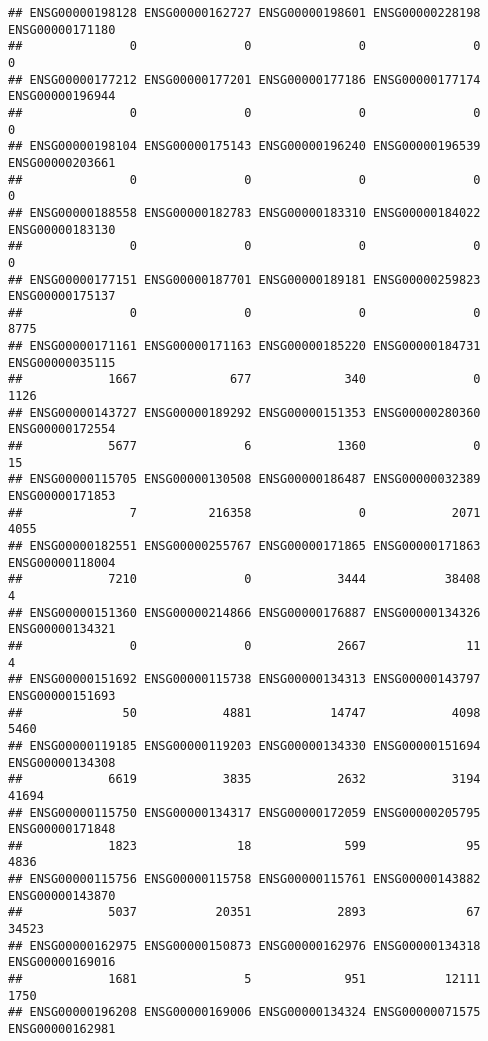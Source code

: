 \documentclass[
]{article}
\begin{document}
\begin{verbatim}
## ENSG00000198128 ENSG00000162727 ENSG00000198601 ENSG00000228198 ENSG00000171180 
##               0               0               0               0               0 
## ENSG00000177212 ENSG00000177201 ENSG00000177186 ENSG00000177174 ENSG00000196944 
##               0               0               0               0               0 
## ENSG00000198104 ENSG00000175143 ENSG00000196240 ENSG00000196539 ENSG00000203661 
##               0               0               0               0               0 
## ENSG00000188558 ENSG00000182783 ENSG00000183310 ENSG00000184022 ENSG00000183130 
##               0               0               0               0               0 
## ENSG00000177151 ENSG00000187701 ENSG00000189181 ENSG00000259823 ENSG00000175137 
##               0               0               0               0            8775 
## ENSG00000171161 ENSG00000171163 ENSG00000185220 ENSG00000184731 ENSG00000035115 
##            1667             677             340               0            1126 
## ENSG00000143727 ENSG00000189292 ENSG00000151353 ENSG00000280360 ENSG00000172554 
##            5677               6            1360               0              15 
## ENSG00000115705 ENSG00000130508 ENSG00000186487 ENSG00000032389 ENSG00000171853 
##               7          216358               0            2071            4055 
## ENSG00000182551 ENSG00000255767 ENSG00000171865 ENSG00000171863 ENSG00000118004 
##            7210               0            3444           38408               4 
## ENSG00000151360 ENSG00000214866 ENSG00000176887 ENSG00000134326 ENSG00000134321 
##               0               0            2667              11               4 
## ENSG00000151692 ENSG00000115738 ENSG00000134313 ENSG00000143797 ENSG00000151693 
##              50            4881           14747            4098            5460 
## ENSG00000119185 ENSG00000119203 ENSG00000134330 ENSG00000151694 ENSG00000134308 
##            6619            3835            2632            3194           41694 
## ENSG00000115750 ENSG00000134317 ENSG00000172059 ENSG00000205795 ENSG00000171848 
##            1823              18             599              95            4836 
## ENSG00000115756 ENSG00000115758 ENSG00000115761 ENSG00000143882 ENSG00000143870 
##            5037           20351            2893              67           34523 
## ENSG00000162975 ENSG00000150873 ENSG00000162976 ENSG00000134318 ENSG00000169016 
##            1681               5             951           12111            1750 
## ENSG00000196208 ENSG00000169006 ENSG00000134324 ENSG00000071575 ENSG00000162981 

\end{verbatim}
\end{document}
